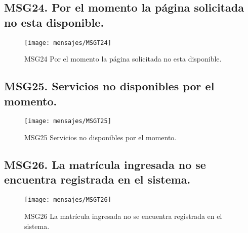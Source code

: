 \subsection{MSG24. Por el momento la página solicitada no esta disponible.}
    \begin{figure}[htbp]
        \begin{center}
            \texttt{[image: mensajes/MSGT24]}
            \caption{MSG24 Por el momento la página solicitada no esta disponible.}
            \label{fig:MSG24}
        \end{center}
    \end{figure}

\subsection{MSG25. Servicios no disponibles por el momento.}
    \begin{figure}[htbp]
        \begin{center}
            \texttt{[image: mensajes/MSGT25]}
            \caption{MSG25 Servicios no disponibles por el momento.}
            \label{fig:MSG25}
        \end{center}
    \end{figure}

\subsection{MSG26. La matrícula ingresada no se encuentra registrada en el sistema.}
    \begin{figure}[htbp]
        \begin{center}
            \texttt{[image: mensajes/MSGT26]}
            \caption{MSG26 La matrícula ingresada no se encuentra registrada en el sistema.}
            \label{fig:MSG26}
        \end{center}
    \end{figure}

